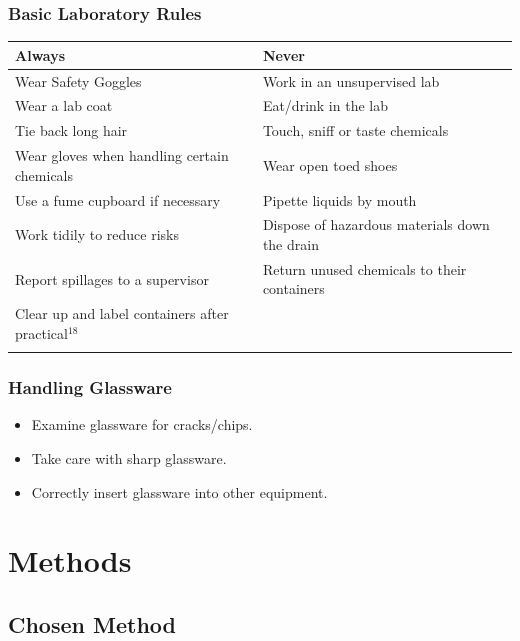\subsubsection{Basic Laboratory Rules}
\begin{center}

\begin{tabular}{|l|l|}
    \hline
    \textbf{Always} & \textbf{Never} \\ \hline
Wear Safety Goggles & Work in an unsupervised lab \\ \hline
Wear a lab coat & Eat/drink in the lab \\ \hline
Tie back long hair & Touch, sniff or taste chemicals \\ \hline
Wear gloves when handling certain chemicals & Wear open toed shoes \\ \hline
Use a fume cupboard if necessary & Pipette liquids by mouth \\ \hline
Work tidily to reduce risks & Dispose of hazardous materials down the drain \\ \hline
Report spillages to a supervisor & Return unused chemicals to their containers \\ \hline
Clear up and label containers after practical$^{18}$ & \\ \hline
\label{tab:BasicLabRules}
\end{tabular}
\end{center}

\subsubsection{Handling Glassware}

\begin{itemize}
\item Examine glassware for cracks/chips.
\item Take care with sharp glassware.
\item Correctly insert glassware into other equipment.
\end{itemize}




\section{Methods}

	\subsection{Chosen Method} \label{Chosen Method}

